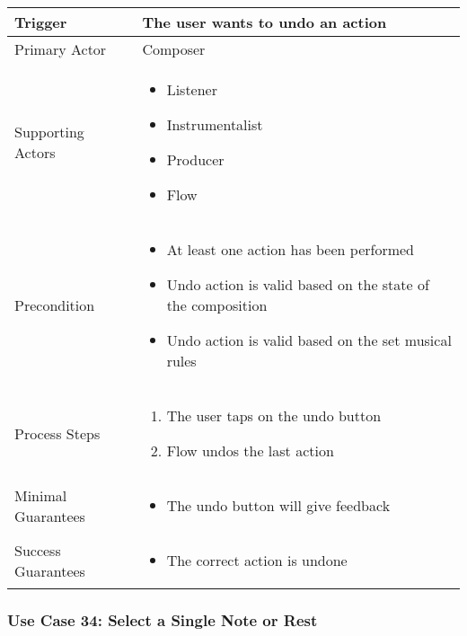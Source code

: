   \begin{tabularx}{\textwidth}{|X|X|}
  \hline
  Trigger & 
  The user wants to undo an action \\
  \hline
  Primary Actor & 
  Composer \\
  \hline
  Supporting Actors & 
  \begin{itemize}
  \item Listener
  \item Instrumentalist
  \item Producer
  \item Flow
  \end{itemize} \\
  \hline
  Precondition & 
  \begin{itemize}
  \item At least one action has been performed
  \item Undo action is valid based on the state of the composition
  \item Undo action is valid based on the set musical rules
  \end{itemize} \\
  \hline
  Process Steps & 
  \begin{enumerate}
  \item The user taps on the undo button
  \item Flow undos the last action
  \end{enumerate} \\
  \hline
  Minimal Guarantees & 
  \begin{itemize}
    \item The undo button will give feedback
  \end{itemize} \\
  \hline
  Success Guarantees & 
  \begin{itemize}
    \item The correct action is undone
  \end{itemize} \\
  \hline
  \end{tabularx}

  \subsubsection{Use Case 34: Select a Single Note or Rest}

